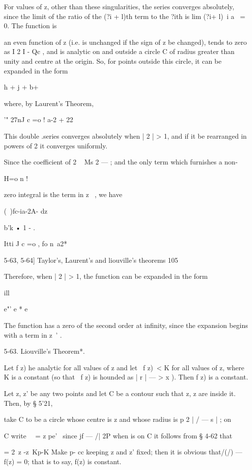 {{{{For values of z, other than these singularities, the series converges
absolutely, since the limit of the ratio of the (?i + l)th term to the
?ith is lim (?i+ l)~i a~ = 0. The function is

an even function of z (i.e. is unchanged if the sign of z be changed),
tends to zero as I 2 I - Qc , and is analytic on and outside a circle
C of radius greater than unity and centre at the origin. So, for
points outside this circle, it can be expanded in the form

h + j + b+

where, by Laurent's Theorem,

'" 27nJ c =o ! a-2 + 22

This double .series converges absolutely when | 2 | > 1, and if it be
rearranged in powers of 2 it converges uniformly.

Since the coefficient of 2 ~ Ms 2 — ; and the only term which
furnishes a non-

H=o n !

zero integral is the term in z~ , we have

(\ )fc-ia-2A- dz



b'k • 1 - .



Itti J c =o , fo n\ a2*



5-63, 5-64] Taylor's, Laurent's and liouville's theorems 105

Therefore, when | 2 | > 1, the function can be expanded in the form

ill

e"' e * e

The function has a zero of the second order at infinity, since the
expansion begins with a term in z~' .

5-63. Liouville's Theorem*.

Let f z) he analytic for all values of z and let \ f z)\ < K for all
values of z, where K is a constant (so that \ f z) is hounded as | r |
— > x ). Then f z) is a constant.

Let z, z' be any two points and let C be a contour such that z, z are
inside it. Then, by § 5'21,

take C to be a circle whose centre is z and whose radius is p 2 | / —
s | ; on

C write \ \ = z pe' \ since jf — /| 2P when is on C it follows from §
4-62 that

= 2\ z -z\ Kp-K Make p- cc keeping z and z' fixed; then it is obvious
that/(/) —f(z) = 0; that is to say, f(z) is constant.

}}}}
